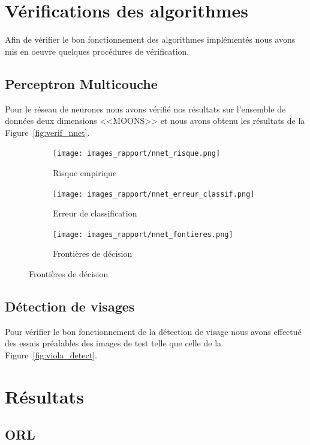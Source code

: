 \documentclass[a4paper,10pt,twocolumn]{extarticle}
\begin{document}
\section{Vérifications des algorithmes}
Afin de vérifier le bon fonctionnement des algorithmes implémentés nous avons mis en oeuvre quelques procédures de vérification.

\subsection{Perceptron Multicouche}
Pour le réseau de neurones nous avons vérifié nos résultats sur l'ensemble de données deux dimensions <<MOONS>> et nous avons obtenu les résultats de la Figure~\ref{fig:verif_nnet}.
\begin{figure}[H]
        \centering
        \caption{Vérification du réseau de neurones}\label{fig:verif_nnet}
        \begin{subfigure}[b]{220pt}
                \centering
                \caption{Risque empirique}
                \texttt{[image: images\_rapport/nnet\_risque.png]}
        \end{subfigure}
        \begin{subfigure}[b]{220pt}
                \centering
                \caption{Erreur de classification}
                \texttt{[image: images\_rapport/nnet\_erreur\_classif.png]}
        \end{subfigure}
        \begin{subfigure}[b]{220pt}
                \centering
                \caption{Frontières de décision}
                \texttt{[image: images\_rapport/nnet\_fontieres.png]}
        \end{subfigure}
\end{figure}

\subsection{Détection de visages}
Pour vérifier le bon fonctionnement de la détection de visage nous avons effectué des essais préalables des images de test telle que celle de la Figure~\ref{fig:viola_detect}.

\section{Résultats}
\subsection{ORL}
\end{document}
